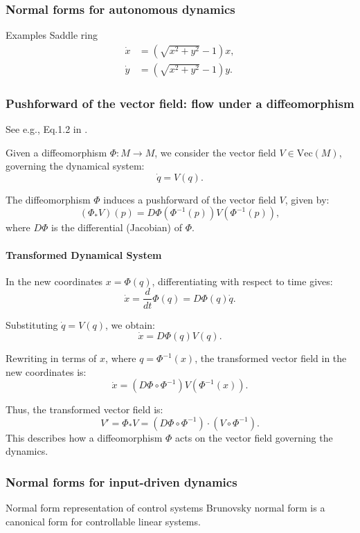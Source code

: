\documentclass{article}
\theoremstyle{definition} \newtheorem{definition}{Definition}  \newtheorem{example}{Example}
\theoremstyle{remark} \newtheorem{remark}{Remark}
\newcounter{ct}
\begin{document}
\subsubsection{Normal forms for autonomous dynamics}
Examples
Saddle ring
\begin{equation}
\begin{aligned}
\dot{x} &= (\sqrt{x^2 + y^2} - 1) x, \\
\dot{y} &= (\sqrt{x^2 + y^2} - 1) y.
\end{aligned}
\end{equation}


\subsubsection{Pushforward of the vector field: flow under a diffeomorphism}
See e.g., Eq.1.2 in \citep{agrachev2013control}.

Given a diffeomorphism \( \Phi: M \to M \), we consider the vector field \( V \in \text{Vec}(M) \), governing the dynamical system:
\[
\dot{q} = V(q).
\]

The diffeomorphism \( \Phi \) induces a pushforward of the vector field \( V \), given by:
\[
(\Phi_* V)(p) = D\Phi(\Phi^{-1}(p)) V(\Phi^{-1}(p)),
\]
where \( D\Phi \) is the differential (Jacobian) of \( \Phi \).  

\paragraph{Transformed Dynamical System}
In the new coordinates \( x = \Phi(q) \), differentiating with respect to time gives:
\[
\dot{x} = \frac{d}{dt} \Phi(q) = D\Phi(q) \dot{q}.
\]

Substituting \( \dot{q} = V(q) \), we obtain:
\[
\dot{x} = D\Phi(q) V(q).
\]

Rewriting in terms of \( x \), where \( q = \Phi^{-1}(x) \), the transformed vector field in the new coordinates is:
\[
\dot{x} = (D\Phi \circ \Phi^{-1}) V(\Phi^{-1}(x)).
\]

Thus, the transformed vector field is:
\[
V' = \Phi_* V = (D\Phi \circ \Phi^{-1}) \cdot (V \circ \Phi^{-1}).
\]
This describes how a diffeomorphism \( \Phi \) acts on the vector field governing the dynamics.




\subsubsection{Normal forms for input-driven dynamics}
Normal form representation of control systems  \citep{gilbert1963controllability}
Brunovsky normal form is a canonical form for controllable linear systems.
\end{document}
